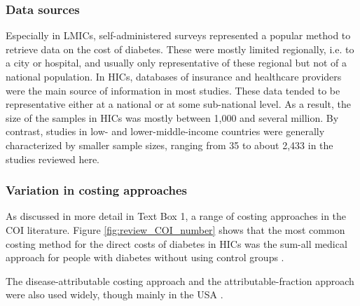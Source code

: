 \subsubsection{Data sources}
Especially in \acp{LMIC}, self-administered surveys represented a popular method to retrieve data on the cost of diabetes. These were mostly limited regionally, i.e. to a city or hospital, and usually only representative of these regional \DIFdelbegin {}\DIFdelend \DIFaddbegin {}\DIFaddend but not of a national population. In \acp{HIC}, databases of insurance and healthcare providers were the main source of information in most studies. These data tended to be representative either at a national or at some sub-national level. As a result, the size of the samples in \acp{HIC} was mostly between 1,000 and several million. By contrast, studies in low- and lower-middle-income countries were generally characterized by smaller sample sizes, ranging from 35 \parencite{Suleiman2006} to about 2,433 \parencite{Yang2012} in the studies reviewed here.

\subsubsection{Variation in costing approaches}
As discussed in more detail in Text Box 1, a range of costing approaches \DIFdelbegin {}\DIFdelend \DIFaddbegin {}\DIFaddend in the \ac{COI} literature. Figure \ref{fig:review_COI_number} shows that the most common costing method for the direct costs of diabetes in \acp{HIC} was the sum-all medical approach for people with diabetes without using control groups \parencite{Kirigia2009,Boutayeb2014,Barcelo2003,Jonsson2002b,Ohinmaa2004,Lau2011a,Pohar2007,Gonzalez2009b,Horak2009,Martin2007b,Nolan2006c,Lucioni2003,Morsanutto2006b,Nakamura2008,Arredondo2004,Arredondo2007,Arredondo2005a,Arredondo2011b,Redekop2002b,Bjegovic2007b,Oliva2004a,Ringborg2008a,Chi2011a,Zhou2005a,Condliffe2014,Brandle2003d,Peele2002a,Lee2006,Maciejewski2004}. 

The disease-attributable costing approach \parencite{Suleiman2006,Abdulkadri2009b,Davis2006b,Simpson2003,RodriguezBolanos2010a,Solli2010a,Ballesta2006,Mata2002a,Lin2004,Dall2003a,Buescher2010,Tunceli2010c,Johnson2006d,Honkasalo2014,Bastida2002} and the attributable-fraction approach were also used widely, though mainly in the USA \parencite{AmericalDiabetesAssociation2008,Dawson2002b,Schmitt-Koopmann2004b,Dall2010,Bolin2009d,Honeycutt2009a,Lesniowska2014}. 

